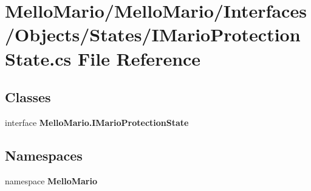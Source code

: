 \section{Mello\+Mario/\+Mello\+Mario/\+Interfaces/\+Objects/\+States/\+I\+Mario\+Protection\+State.cs File Reference}
\label{IMarioProtectionState_8cs}
\subsection*{Classes}
\begin{DoxyCompactItemize}
\item 
interface \textbf{ Mello\+Mario.\+I\+Mario\+Protection\+State}
\end{DoxyCompactItemize}
\subsection*{Namespaces}
\begin{DoxyCompactItemize}
\item 
namespace \textbf{ Mello\+Mario}
\end{DoxyCompactItemize}
